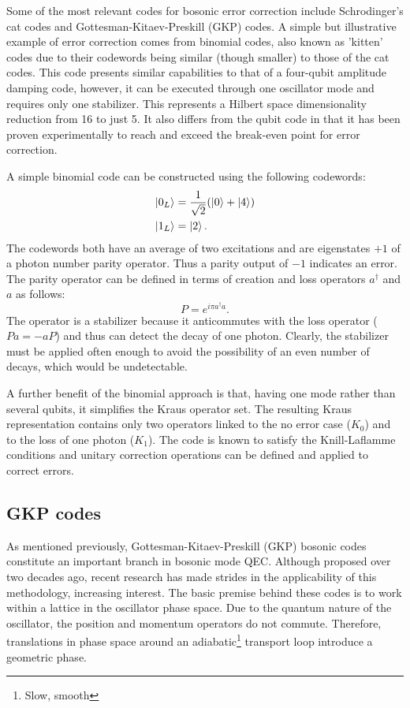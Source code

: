 Some of the most relevant codes for bosonic error correction include Schrodinger's cat codes and Gottesman-Kitaev-Preskill (GKP) codes\cite{Girvin2021}. A simple but illustrative example of error correction comes from binomial codes, also known as 'kitten' codes due to their codewords being similar (though smaller) to those of the cat codes. This code presents similar capabilities to that of a four-qubit amplitude damping code, however, it can be executed through one oscillator mode and requires only one stabilizer. This represents a Hilbert space dimensionality reduction from 16 to just 5. It also differs from the qubit code in that it has been proven experimentally to reach and exceed the break-even point for error correction.

A simple binomial code can be constructed using the following codewords:
\begin{eqnarray}
    \ket{0_L}&=\frac{1}{\sqrt{2}}(\ket{0}+\ket{4})\\
    \ket{1_L}&=\ket{2}.
\end{eqnarray}
The codewords both have an average of two excitations and are eigenstates $+ 1$ of a photon number parity operator. Thus a parity output of $-1$ indicates an error. The parity operator can be defined in terms of creation and loss operators $a^\dagger$ and $a$ as follows:
\begin{equation}
    P=e^{i\pi a^\dagger a}.
\end{equation}
The operator is a stabilizer because it anticommutes with the loss operator ($Pa=-aP$) and thus can detect the decay of one photon. Clearly, the stabilizer must be applied often enough to avoid the possibility of an even number of decays, which would be undetectable. 

A further benefit of the binomial approach is that, having one mode rather than several qubits, it simplifies the Kraus operator set. The resulting Kraus representation contains only two operators linked to the no error case ($K_0$) and to the loss of one photon ($K_1$). The code is known to satisfy the Knill-Laflamme conditions and unitary correction operations can be defined and applied to correct errors.

\subsection{GKP codes}

As mentioned previously, Gottesman-Kitaev-Preskill (GKP) bosonic codes constitute an important branch in bosonic mode QEC\cite{Gottesman2001,Girvin2021,campagne2020,Terhal2020,Grimsmo2021,Brady2023,lachance2023}. Although proposed over two decades ago, recent research has made strides in the applicability of this methodology, increasing interest. The basic premise behind these codes is to work within a lattice in the oscillator phase space. Due to the quantum nature of the oscillator, the position and momentum operators do not commute. Therefore, translations in phase space around an adiabatic\footnote{Slow, smooth} transport loop introduce a geometric phase.

